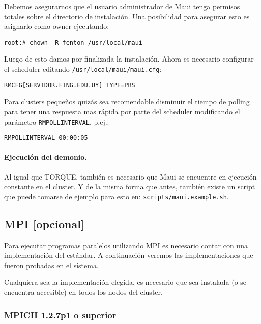 \documentclass[a4paper,10pt,spanish]{article}
\begin{document}
Debemos asegurarnos que el usuario administrador de Maui tenga permisos totales sobre el directorio de instalaci\'{o}n. Una posibilidad para asegurar esto es asignarlo como owner ejecutando:

\begin{verbatim}
root:# chown -R fenton /usr/local/maui
\end{verbatim}

Luego de esto damos por finalizada la instalaci\'{o}n. Ahora es necesario configurar el scheduler editando \mbox{\texttt{/usr/local/maui/maui.cfg}}:

\begin{verbatim}
RMCFG[SERVIDOR.FING.EDU.UY] TYPE=PBS
\end{verbatim}

Para clusters peque\~{n}os quiz\'{a}s sea recomendable disminuir el tiempo de polling para tener una respuesta mas r\'{a}pida por parte del scheduler modificando el par\'{a}metro \texttt{RMPOLLINTERVAL}, p.ej.:

\begin{verbatim}
RMPOLLINTERVAL 00:00:05
\end{verbatim}

\paragraph{Ejecuci\'{o}n del demonio.}

Al igual que TORQUE, tambi\'{e}n es necesario que Maui se encuentre en ejecuci\'{o}n constante en el cluster. Y de la misma forma que antes, tambi\'{e}n existe un script que puede tomarse de ejemplo para esto en: \mbox{\texttt{scripts/maui.example.sh}}.

\subsection{MPI \small{[opcional]}}

Para ejecutar programas paralelos utilizando MPI es necesario contar con una implementaci\'{o}n del est\'{a}ndar. A continuaci\'{o}n veremos las implementaciones que fueron probadas en el sistema.

Cualquiera sea la implementaci\'{o}n elegida, es necesario que sea instalada (o se encuentra accesible) en todos los nodos del cluster.

\subsubsection{MPICH 1.2.7p1 o superior}
\end{document}
